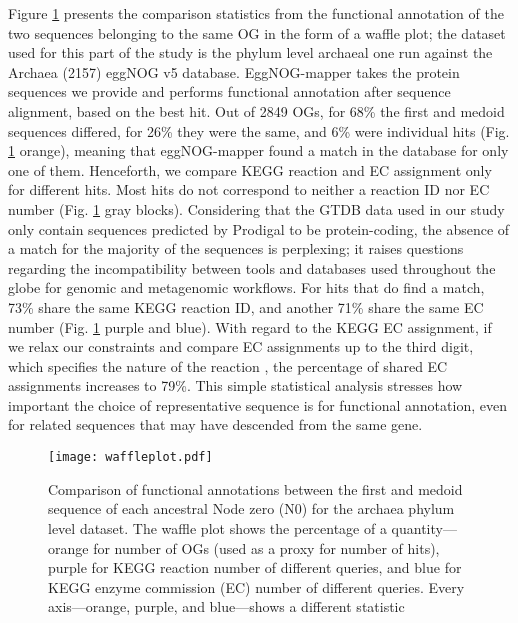 Figure \ref{waffleplot} presents the comparison statistics from the functional annotation of the two sequences belonging to the same OG in the form of a waffle plot; the dataset used for this part of the study is the phylum level archaeal one run against the Archaea (2157) eggNOG v5 database. EggNOG-mapper takes the protein sequences we provide and performs functional annotation after sequence alignment, based on the best hit. Out of 2849 OGs, for 68\% the first and medoid sequences differed, for 26\% they were the same, and 6\% were individual hits (Fig. \ref{waffleplot} orange), meaning that eggNOG-mapper found a match in the database for only one of them. Henceforth, we compare KEGG reaction and EC assignment only for different hits. Most hits do not correspond to neither a reaction ID nor EC number (Fig. \ref{waffleplot} gray blocks). Considering that the GTDB data used in our study only contain sequences predicted by Prodigal to be protein-coding, the absence of a match for the majority of the sequences is perplexing; it raises questions regarding the incompatibility between tools and databases used throughout the globe for genomic and metagenomic workflows. For hits that do find a match, 73\% share the same KEGG reaction ID, and another 71\% share the same EC number (Fig. \ref{waffleplot} purple and blue). With regard to the KEGG EC assignment, if we relax our constraints and compare EC assignments up to the third digit, which specifies the nature of the reaction \cite{mcdonald2009}, the percentage of shared EC assignments increases to 79\%. This simple statistical analysis stresses how important the choice of representative sequence is for functional annotation, even for related sequences that may have descended from the same gene. 

\begin{figure}[H]
    \centering
    \texttt{[image: waffleplot.pdf]}
    \caption{Comparison of functional annotations between the first and medoid sequence of each ancestral Node zero (N0) for the archaea phylum level dataset. The waffle plot shows the percentage of a quantity---orange for number of OGs (used as a proxy for number of hits), purple for KEGG reaction number of different queries, and blue for KEGG enzyme commission (EC) number of different queries.  
     Every axis---orange, purple, and blue---shows a different statistic}
    \label{waffleplot}
\end{figure}   

